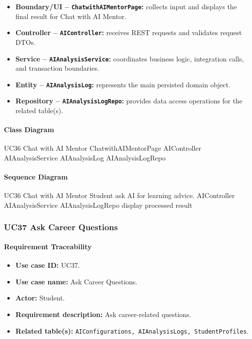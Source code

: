 \begin{itemize}
    \item \textbf{Boundary/UI -- \texttt{ChatwithAIMentorPage}:} collects input and displays the final result for Chat with AI Mentor.
    \item \textbf{Controller -- \texttt{AIController}:} receives REST requests and validates request DTOs.
    \item \textbf{Service -- \texttt{AIAnalysisService}:} coordinates business logic, integration calls, and transaction boundaries.
    \item \textbf{Entity -- \texttt{AIAnalysisLog}:} represents the main persisted domain object.
    \item \textbf{Repository -- \texttt{AIAnalysisLogRepo}:} provides data access operations for the related table(s).
\end{itemize}

\paragraph{Class Diagram}

\ClassDiagram
{UC36 Chat with AI Mentor}
{ChatwithAIMentorPage}
{AIController}
{AIAnalysisService}
{AIAnalysisLog}
{AIAnalysisLogRepo}

\paragraph{Sequence Diagram}

\SequenceDiagram
{UC36 Chat with AI Mentor}
{Student}
{ask AI for learning advice.}
{AIController}
{AIAnalysisService}
{AIAnalysisLogRepo}
{display processed result}

\subsubsection{UC37 Ask Career Questions}

\paragraph{Requirement Traceability}

\begin{itemize}
    \item \textbf{Use case ID:} UC37.
    \item \textbf{Use case name:} Ask Career Questions.
    \item \textbf{Actor:} Student.
    \item \textbf{Requirement description:} Ask career-related questions.
    \item \textbf{Related table(s):} \texttt{AIConfigurations, AIAnalysisLogs, StudentProfiles}.
\end{itemize}

